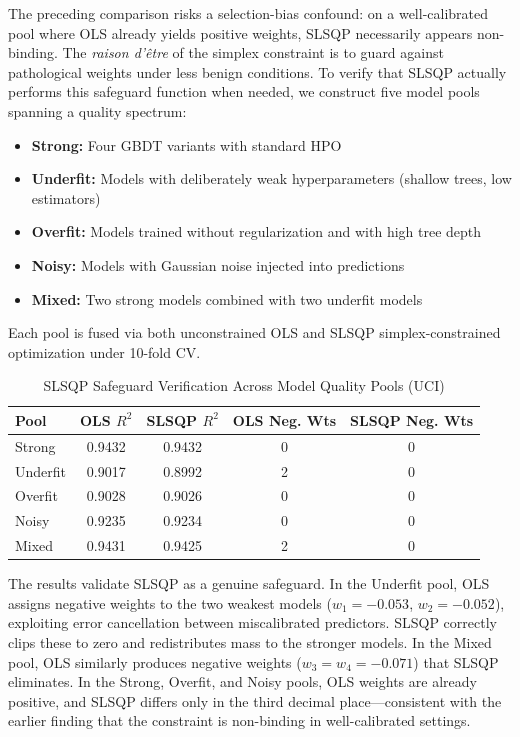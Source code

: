 \documentclass[journal]{IEEEtran}
\begin{document}
The preceding comparison risks a selection-bias confound: on a well-calibrated pool where OLS already yields positive weights, SLSQP necessarily appears non-binding. The \emph{raison d'\^{e}tre} of the simplex constraint is to guard against pathological weights under less benign conditions. To verify that SLSQP actually performs this safeguard function when needed, we construct five model pools spanning a quality spectrum:

\begin{itemize}
\item \textbf{Strong:} Four GBDT variants with standard HPO
\item \textbf{Underfit:} Models with deliberately weak hyperparameters (shallow trees, low estimators)
\item \textbf{Overfit:} Models trained without regularization and with high tree depth
\item \textbf{Noisy:} Models with Gaussian noise injected into predictions
\item \textbf{Mixed:} Two strong models combined with two underfit models
\end{itemize}

Each pool is fused via both unconstrained OLS and SLSQP simplex-constrained optimization under 10-fold CV.

\begin{table}[!t]
\renewcommand{\arraystretch}{1.15}
\caption{SLSQP Safeguard Verification Across Model Quality Pools (UCI)}
\label{tab:slsqp_safeguard}
\centering
\footnotesize
\begin{tabular}{lcccc}
\toprule
\textbf{Pool} & \textbf{OLS $R^2$} & \textbf{SLSQP $R^2$} & \textbf{OLS Neg. Wts} & \textbf{SLSQP Neg. Wts} \\
\midrule
Strong   & 0.9432 & 0.9432 & 0 & 0 \\
Underfit & 0.9017 & 0.8992 & 2 & 0 \\
Overfit  & 0.9028 & 0.9026 & 0 & 0 \\
Noisy    & 0.9235 & 0.9234 & 0 & 0 \\
Mixed    & 0.9431 & 0.9425 & 2 & 0 \\
\bottomrule
\end{tabular}
\end{table}

The results validate SLSQP as a genuine safeguard. In the Underfit pool, OLS assigns negative weights to the two weakest models ($w_1 = -0.053$, $w_2 = -0.052$), exploiting error cancellation between miscalibrated predictors. SLSQP correctly clips these to zero and redistributes mass to the stronger models. In the Mixed pool, OLS similarly produces negative weights ($w_3 = w_4 = -0.071$) that SLSQP eliminates. In the Strong, Overfit, and Noisy pools, OLS weights are already positive, and SLSQP differs only in the third decimal place---consistent with the earlier finding that the constraint is non-binding in well-calibrated settings.
\end{document}
